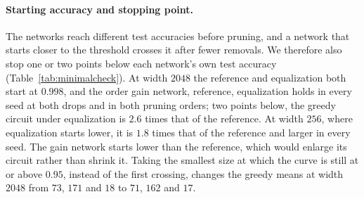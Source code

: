 \documentclass{article} %
\begin{document}
\paragraph{Starting accuracy and stopping point.} The networks reach different test accuracies before pruning, and a network that starts closer to the threshold crosses it after fewer removals. We therefore also stop one or two points below each network's own test accuracy (Table~\ref{tab:minimalcheck}). At width $2048$ the reference and equalization both start at $0.998$, and the order gain network, reference, equalization holds in every seed at both drops and in both pruning orders; two points below, the greedy circuit under equalization is $2.6$ times that of the reference. At width $256$, where equalization starts lower, it is $1.8$ times that of the reference and larger in every seed. The gain network starts lower than the reference, which would enlarge its circuit rather than shrink it. Taking the smallest size at which the curve is still at or above $0.95$, instead of the first crossing, changes the greedy means at width $2048$ from $73$, $171$ and $18$ to $71$, $162$ and $17$.
\end{document}
